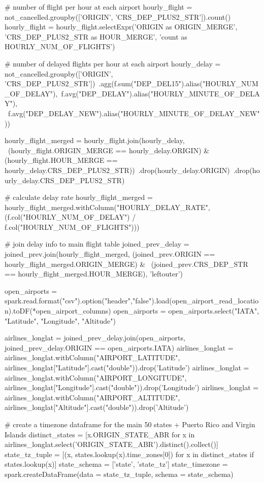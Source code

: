 \documentclass[11pt]{article}
\begin{document}
# number of flight per hour at each airport
hourly_flight = not_cancelled.groupby(['ORIGIN', 'CRS_DEP_PLUS2_STR']).count()
hourly_flight = hourly_flight.selectExpr('ORIGIN as ORIGIN_MERGE', 'CRS_DEP_PLUS2_STR as HOUR_MERGE', 'count as HOURLY_NUM_OF_FLIGHTS')

# number of delayed flights per hour at each airport
hourly_delay = not_cancelled.groupby(['ORIGIN', 'CRS_DEP_PLUS2_STR'])\
                            .agg(f.sum("DEP_DEL15").alias("HOURLY_NUM_OF_DELAY"),\
                                 f.avg("DEP_DELAY").alias("HOURLY_MINUTE_OF_DELAY"), \
                                 f.avg("DEP_DELAY_NEW").alias("HOURLY_MINUTE_OF_DELAY_NEW"))

hourly_flight_merged = hourly_flight.join(hourly_delay, \
                      (hourly_flight.ORIGIN_MERGE == hourly_delay.ORIGIN) & 
                      (hourly_flight.HOUR_MERGE == hourly_delay.CRS_DEP_PLUS2_STR))\
                      .drop(hourly_delay.ORIGIN)\
                      .drop(hourly_delay.CRS_DEP_PLUS2_STR)

# calculate delay rate
hourly_flight_merged = hourly_flight_merged.withColumn("HOURLY_DELAY_RATE",  (f.col("HOURLY_NUM_OF_DELAY") / f.col("HOURLY_NUM_OF_FLIGHTS")))

# join delay info to main flight table
joined_prev_delay = joined_prev.join(hourly_flight_merged, (joined_prev.ORIGIN == hourly_flight_merged.ORIGIN_MERGE) & \
                                     (joined_prev.CRS_DEP_STR == hourly_flight_merged.HOUR_MERGE), 'leftouter')
                                     
open_airports = spark.read.format("csv").option("header","false").load(open_airport_read_location).toDF(*open_airport_columns)
open_airports = open_airports.select("IATA", "Latitude", "Longitude", "Altitude")

airlines_longlat = joined_prev_delay.join(open_airports, joined_prev_delay.ORIGIN == open_airports.IATA)
airlines_longlat = airlines_longlat.withColumn("AIRPORT_LATITUDE", airlines_longlat["Latitude"].cast("double")).drop('Latitude')
airlines_longlat = airlines_longlat.withColumn("AIRPORT_LONGITUDE", airlines_longlat["Longitude"].cast("double")).drop('Longitude')
airlines_longlat = airlines_longlat.withColumn("AIRPORT_ALTITUDE", airlines_longlat["Altitude"].cast("double")).drop('Altitude')

# create a timezone dataframe for the main 50 states + Puerto Rico and Virgin Islands
distinct_states = [x.ORIGIN_STATE_ABR for x in airlines_longlat.select('ORIGIN_STATE_ABR').distinct().collect()]
state_tz_tuple = [(x, states.lookup(x).time_zones[0]) for x in distinct_states if states.lookup(x)]
state_schema = ['state', 'state_tz']
state_timezone = spark.createDataFrame(data = state_tz_tuple, schema = state_schema)
\end{document}
